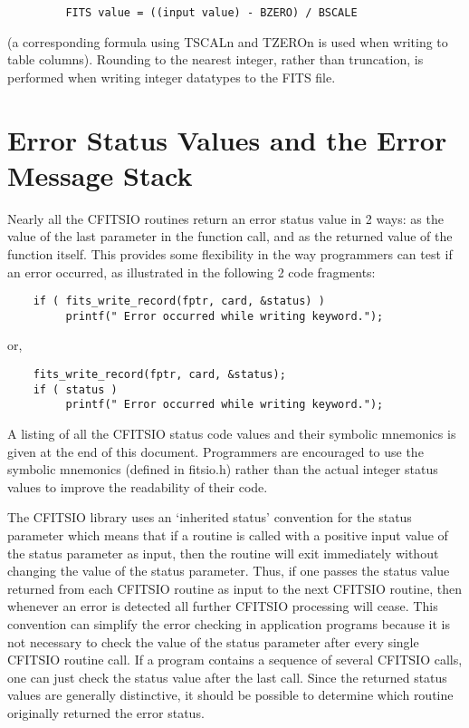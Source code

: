 \begin{verbatim}
         FITS value = ((input value) - BZERO) / BSCALE
\end{verbatim}
(a corresponding formula using TSCALn and TZEROn is used when
writing to table columns).  Rounding to the nearest integer, rather
than truncation, is performed when writing integer datatypes to the
FITS file.


\section{Error Status Values and the Error Message Stack}

Nearly all the CFITSIO routines return an error status value
in 2 ways: as the value of the last parameter in the function call,
and as the returned value of the function itself.  This provides
some flexibility in the way programmers can test if an error
occurred, as illustrated in the following 2 code fragments:

\begin{verbatim}
    if ( fits_write_record(fptr, card, &status) )
         printf(" Error occurred while writing keyword.");
\end{verbatim}
or,

\begin{verbatim}
    fits_write_record(fptr, card, &status);
    if ( status )
         printf(" Error occurred while writing keyword.");
\end{verbatim}
A listing of all the CFITSIO status code values and their symbolic
mnemonics is given at the end of this document.  Programmers are
encouraged to use the symbolic  mnemonics (defined in fitsio.h) rather
than the actual integer status values to improve the readability of
their code.

The CFITSIO library uses an `inherited status' convention for the
status parameter which means that if a routine is called with a
positive input value of the status parameter as input, then the routine
will exit immediately without changing the value of the status
parameter.  Thus, if one passes the status value returned from each
CFITSIO routine as input to the next CFITSIO routine, then whenever an
error is detected all further CFITSIO processing will cease.  This
convention can simplify the error checking in application programs
because it is not necessary to check the value of the status parameter
after every single CFITSIO routine call.  If a program contains a
sequence of several CFITSIO calls, one can just check the status value
after the last call.  Since the returned status values are generally
distinctive, it should be possible to determine which routine
originally returned the error status.

